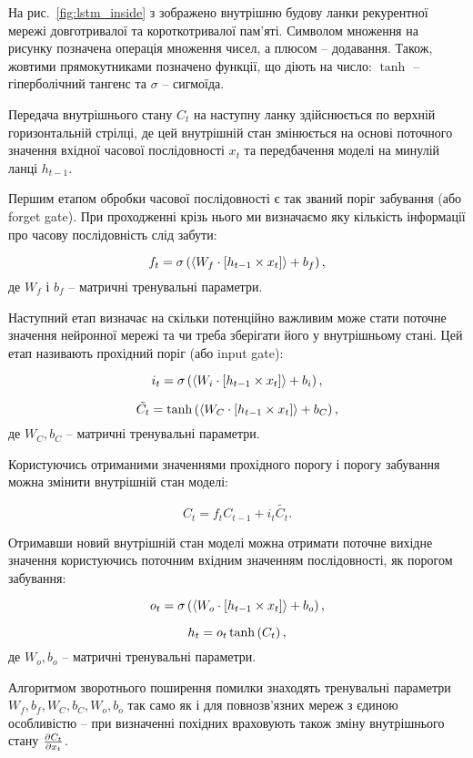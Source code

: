 На рис.~\ref{fig:lstm_inside} з \cite{imp:Varsamopoulos2018} зображено 
внутрішню будову ланки рекурентної мережі довготривалої та короткотривалої 
пам'яті. Символом множення на рисунку позначена операція множення чисел, а 
плюсом -- додавання. Також, жовтими прямокутниками позначено функції, що діють 
на число: $ \tanh $ -- гіперболічний тангенс та $ \sigma $ -- сигмоїда.

Передача внутрішнього стану $ C_t $ на наступну ланку здійснюється по 
верхній горизонтальній стрілці, де цей внутрішній стан змінюється на основі
поточного значення вхідної часової послідовності $ x_t $ та передбачення 
моделі на минулій ланці $ h_{t-1} $.

Першим етапом обробки часової послідовності є так званий поріг забування
(або forget gate). При проходженні крізь нього ми визначаємо яку 
кількість інформації про часову послідовність слід забути:

\begin{equation}
f_t = \sigma \left( \left< W_f \cdot \left[ h_{t-1} \times x_t \right] \right> + b_f \right),
\end{equation}
%
де $ W_f $ і $ b_f $ -- матричні тренувальні параметри.

Наступний етап визначає на скільки потенційно важливим може стати поточне 
значення нейронної мережі та чи треба зберігати його у внутрішньому стані. 
Цей етап називають прохідний поріг (або input gate):

\begin{equation}
i_t = \sigma \left( \left< W_i \cdot \left[ h_{t-1} \times x_t \right] \right> + b_i \right),
\end{equation}

\begin{equation}
\tilde{C_t} = \tanh \left( \left< W_C \cdot \left[ h_{t-1} \times x_t \right] \right> + b_C \right),
\end{equation}
%
де $ W_C, b_C $ -- матричні тренувальні параметри.

Користуючись отриманими значеннями прохідного порогу і порогу забування
можна змінити внутрішній стан моделі:

\begin{equation}
C_t = f_t C_{t-1} + i_t \tilde{C_t}.
\end{equation}

Отримавши новий внутрішній стан моделі можна отримати поточне вихідне 
значення користуючись поточним вхідним значенням послідовності, як порогом 
забування:

\begin{equation}
o_t = \sigma \left( \left< W_o \cdot \left[ h_{t-1} \times x_t \right] \right> + b_o \right),
\end{equation}

\begin{equation}
h_t = o_t \tanh \left( C_t \right),
\end{equation}
%
де $ W_o, b_o $ -- матричні тренувальні параметри.

Алгоритмом зворотнього поширення помилки знаходять тренувальні 
параметри $ W_f, b_f, W_C, b_C, W_o, b_o $ так само як і для повнозв'язних 
мереж з єдиною особливістю -- при визначенні похідних враховують також
зміну внутрішнього стану $ \frac{\partial C_t}{\partial x_t} $.
